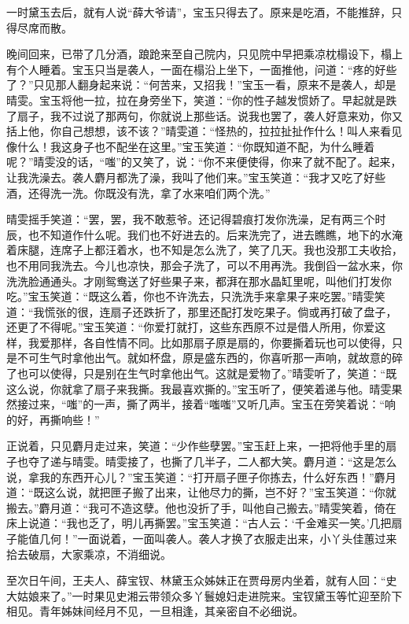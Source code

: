 一时黛玉去后，就有人说“薛大爷请”，宝玉只得去了。原来是吃酒，不能推辞，只得尽席而散。

晚间回来，已带了几分酒，踉跄来至自己院内，只见院中早把乘凉枕榻设下，榻上有个人睡着。宝玉只当是袭人，一面在榻沿上坐下，一面推他，问道：“疼的好些了？”只见那人翻身起来说：“何苦来，又招我！”宝玉一看，原来不是袭人，却是晴雯。宝玉将他一拉，拉在身旁坐下，笑道：“你的性子越发惯娇了。早起就是跌了扇子，我不过说了那两句，你就说上那些话。说我也罢了，袭人好意来劝，你又括上他，你自己想想，该不该？”晴雯道：“怪热的，拉拉扯扯作什么！叫人来看见像什么！我这身子也不配坐在这里。”宝玉笑道：“你既知道不配，为什么睡着呢？”晴雯没的话，“嗤”的又笑了，说：“你不来便使得，你来了就不配了。起来，让我洗澡去。袭人麝月都洗了澡，我叫了他们来。”宝玉笑道：“我才又吃了好些酒，还得洗一洗。你既没有洗，拿了水来咱们两个洗。”

晴雯摇手笑道：“罢，罢，我不敢惹爷。还记得碧痕打发你洗澡，足有两三个时辰，也不知道作什么呢。我们也不好进去的。后来洗完了，进去瞧瞧，地下的水淹着床腿，连席子上都汪着水，也不知是怎么洗了，笑了几天。我也没那工夫收拾，也不用同我洗去。今儿也凉快，那会子洗了，可以不用再洗。我倒舀一盆水来，你洗洗脸通通头。才刚鸳鸯送了好些果子来，都湃在那水晶缸里呢，叫他们打发你吃。”宝玉笑道：“既这么着，你也不许洗去，只洗洗手来拿果子来吃罢。”晴雯笑道：“我慌张的很，连扇子还跌折了，那里还配打发吃果子。倘或再打破了盘子，还更了不得呢。”宝玉笑道：“你爱打就打，这些东西原不过是借人所用，你爱这样，我爱那样，各自性情不同。比如那扇子原是扇的，你要撕着玩也可以使得，只是不可生气时拿他出气。就如杯盘，原是盛东西的，你喜听那一声响，就故意的碎了也可以使得，只是别在生气时拿他出气。这就是爱物了。”晴雯听了，笑道：“既这么说，你就拿了扇子来我撕。我最喜欢撕的。”宝玉听了，便笑着递与他。晴雯果然接过来，“嗤”的一声，撕了两半，接着“嗤嗤”又听几声。宝玉在旁笑着说：“响的好，再撕响些！”

正说着，只见麝月走过来，笑道：“少作些孽罢。”宝玉赶上来，一把将他手里的扇子也夺了递与晴雯。晴雯接了，也撕了几半子，二人都大笑。麝月道：“这是怎么说，拿我的东西开心儿？”宝玉笑道：“打开扇子匣子你拣去，什么好东西！”麝月道：“既这么说，就把匣子搬了出来，让他尽力的撕，岂不好？”宝玉笑道：“你就搬去。”麝月道：“我可不造这孽。他也没折了手，叫他自己搬去。”晴雯笑着，倚在床上说道：“我也乏了，明儿再撕罢。”宝玉笑道：“古人云：‘千金难买一笑。’几把扇子能值几何！”一面说着，一面叫袭人。袭人才换了衣服走出来，小丫头佳蕙过来拾去破扇，大家乘凉，不消细说。

至次日午间，王夫人、薛宝钗、林黛玉众姊妹正在贾母房内坐着，就有人回：“史大姑娘来了。”一时果见史湘云带领众多丫鬟媳妇走进院来。宝钗黛玉等忙迎至阶下相见。青年姊妹间经月不见，一旦相逢，其亲密自不必细说。

